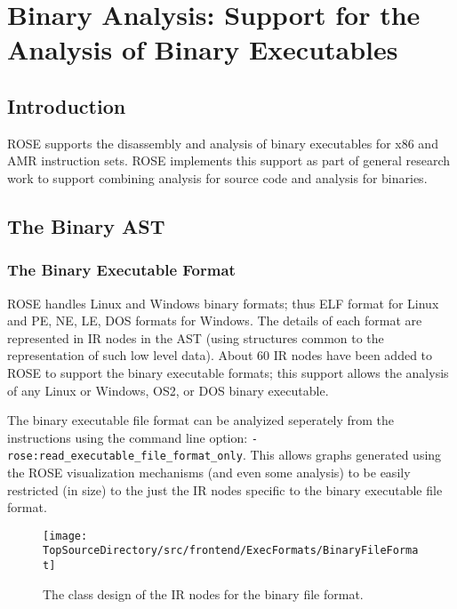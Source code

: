 
\chapter{Binary Analysis: Support for the Analysis of Binary Executables}

\label{binaryAnalysis::overview}

\section{Introduction}

   ROSE supports the disassembly and analysis of binary executables for x86 and AMR
instruction sets.  ROSE implements this support as part of general research work
to support combining analysis for source code and analysis for binaries.

\section{The Binary AST}

\subsection{The Binary Executable Format}

    ROSE handles Linux and Windows binary formats; thus ELF format for Linux and PE, NE,
LE, DOS formats for Windows.  The details of each format are represented in IR nodes in
the AST (using structures common to the representation of such low level data).  About
60 IR nodes have been added to ROSE to support the binary executable formats; this
support allows the analysis of any Linux or Windows, OS\/2, or DOS binary executable.

   The binary executable file format can be analyized seperately from the instructions
using the command line option: {\tt -rose:read\_executable\_file\_format\_only}.  This
allows graphs generated using the ROSE visualization mechanisms (and even some analysis) 
to be easily restricted (in size) to the just the IR nodes specific to the binary
executable file format.


\begin{figure}
\texttt{[image: \\TopSourceDirectory/src/frontend/ExecFormats/BinaryFileFormat]}
\caption{The class design of the IR nodes for the binary file format.} 

\label{binaryAnalysis:BinaryExecutableFormatDesign}
\end{figure}

